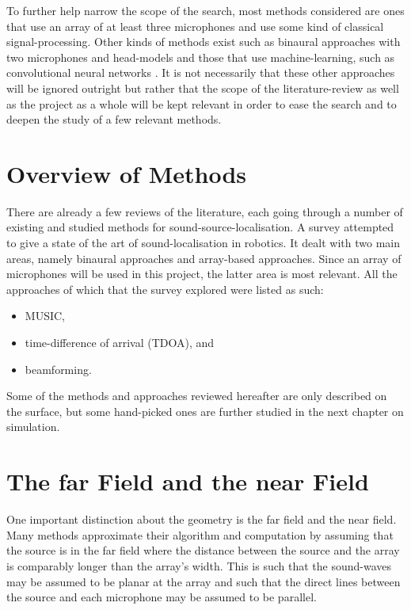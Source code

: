 \documentclass[notitlepage]{report}
\begin{document}
To further help narrow the scope of the search, most methods considered are ones that use an array of at least three microphones and use some kind of classical signal-processing. Other kinds of methods exist such as binaural approaches with two microphones and head-models \cite{argentieri_survey_2015} and those that use machine-learning, such as convolutional neural networks \cite{sakavicius_multiple_2022}. It is not necessarily that these other approaches will be ignored outright but rather that the scope of the literature-review as well as the project as a whole will be kept relevant in order to ease the search and to deepen the study of a few relevant methods.

\section{Overview of Methods}

There are already a few reviews of the literature, each going through a number of existing and studied methods for sound-source-localisation. A survey \cite{argentieri_survey_2015} attempted to give a state of the art of sound-localisation in robotics. It dealt with two main areas, namely binaural approaches and array-based approaches. Since an array of microphones will be used in this project, the latter area is most relevant. All the approaches of which that the survey explored were listed as such:
\begin{itemize}
	\item MUSIC,
	\item time-difference of arrival (TDOA), and
	\item beamforming.
\end{itemize}

Some of the methods and approaches reviewed hereafter are only described on the surface, but some hand-picked ones are further studied in the next chapter on simulation.

\section{The far Field and the near Field} \label{The_far_Field_and_the_near_Field}

One important distinction about the geometry is the far field and the near field. Many methods approximate their algorithm and computation by assuming that the source is in the far field where the distance between the source and the array is comparably longer than the array's width. This is such that the sound-waves may be assumed to be planar at the array and such that the direct lines between the source and each microphone may be assumed to be parallel. 
\end{document}
